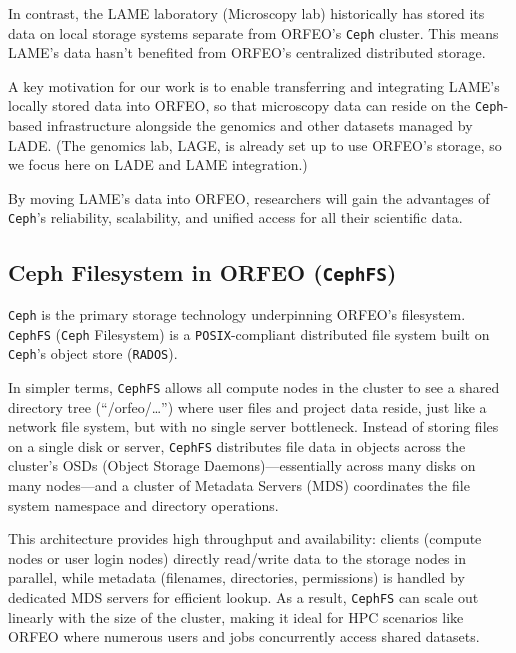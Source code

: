 In contrast, the LAME laboratory (Microscopy lab) historically has stored its 
data on local storage systems separate from ORFEO’s \texttt{Ceph} cluster. This 
means LAME’s data hasn’t benefited from ORFEO’s centralized distributed storage. 

\medskip

A key motivation for our work is to enable transferring and integrating LAME’s 
locally stored data into ORFEO, so that microscopy data can reside on the 
\texttt{Ceph}-based infrastructure alongside the genomics and other datasets 
managed by LADE. (The genomics lab, LAGE, is already set up to use ORFEO’s 
storage, so we focus here on LADE and LAME integration.) 

By moving LAME’s data into ORFEO, researchers will gain the advantages of 
\texttt{Ceph}’s reliability, scalability, and unified access for all their 
scientific data.


\subsection{Ceph Filesystem in ORFEO (\texttt{CephFS})}

\texttt{Ceph} is the primary storage technology underpinning ORFEO’s 
filesystem\parencite{ORFEO_Docs_Storage}. \texttt{CephFS} (\texttt{Ceph} 
Filesystem) is a \texttt{POSIX}-compliant distributed file system built on 
\texttt{Ceph}’s object store (\texttt{RADOS})\parencite{CephFS}. 

In simpler terms, \texttt{CephFS} allows all compute nodes in the cluster to 
see a shared directory tree (“/orfeo/\ldots”) where user files and project data 
reside, just like a network file system, but with no single server bottleneck. 
Instead of storing files on a single disk or server, \texttt{CephFS} distributes 
file data in objects across the cluster’s OSDs (Object Storage Daemons)—essentially 
across many disks on many nodes—and a cluster of Metadata Servers (MDS) 
coordinates the file system namespace and directory 
operations\parencite{CephFS,Ceph_RADOS,RedHat_CephFS}. 

This architecture provides high throughput and availability: clients (compute 
nodes or user login nodes) directly read/write data to the storage nodes in 
parallel, while metadata (filenames, directories, permissions) is handled by 
dedicated MDS servers for efficient lookup\parencite{CephFS,RedHat_CephFS}. As a 
result, \texttt{CephFS} can scale out linearly with the size of the cluster, 
making it ideal for HPC scenarios like ORFEO where numerous users and jobs 
concurrently access shared datasets\parencite{CephFS}.

